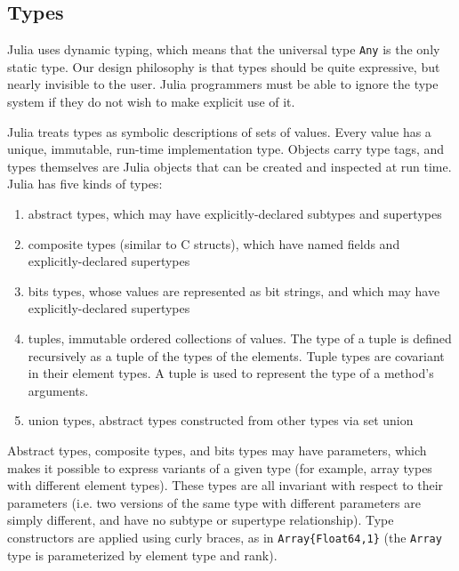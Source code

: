 \documentclass[9pt]{sigplanconf}
\begin{document}


\subsection{Types}

Julia uses dynamic typing, which means that the universal type {\tt Any}
is the only static type. Our design philosophy is that types should be
quite expressive, but nearly invisible to the user. Julia
programmers must be able to ignore the type system if they do
not wish to make explicit use of it.

Julia treats types as symbolic descriptions of sets of values. Every value has
a unique, immutable, run-time implementation type. Objects carry type tags, and
types themselves are Julia objects that can be created and inspected
at run time.
Julia has five kinds of types:

\begin{enumerate}
\item abstract types, which may have explicitly-declared subtypes and supertypes
\item composite types (similar to C structs), which have named fields and
      explicitly-declared supertypes
\item bits types, whose values are represented as bit strings, and which may
      have explicitly-declared supertypes
\item tuples, immutable ordered collections of values. The type of a tuple is
defined recursively as a tuple of the types of the elements. Tuple types are
covariant in their element types. A tuple is used to represent the type of a
method's arguments.
\item union types, abstract types constructed from other types via set union
\end{enumerate}

Abstract types, composite types, and bits types may have parameters, which
makes it possible to express variants of a given type (for example, array types
with different element types). These types are all invariant with respect to
their parameters (i.e. two versions of the same type with different parameters
are simply different, and have no subtype or supertype relationship). Type
constructors are applied using curly braces, as in {\tt Array\{Float64,1\}}
(the {\tt Array} type is parameterized by element type and rank).
\end{document}
